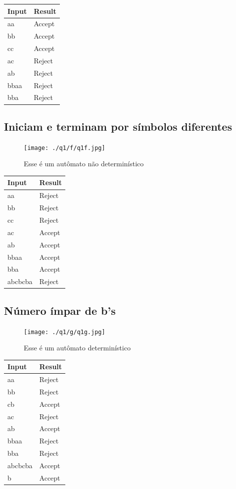 \documentclass[11pt]{article}
\begin{document}
\begin{center}
\begin{tabular}{ll}
Input & Result\\
\hline
aa & Accept\\
bb & Accept\\
cc & Accept\\
ac & Reject\\
ab & Reject\\
bbaa & Reject\\
bba & Reject\\
\end{tabular}
\end{center}
\pagebreak
\subsection{Iniciam e terminam por símbolos diferentes}
\label{sec:org504c22a}

\begin{figure}[htbp]
\centering
\texttt{[image: ./q1/f/q1f.jpg]}
\caption{\label{fig:org5a5969d}
Esse é um autômato não determinístico}
\end{figure}

\begin{center}
\begin{tabular}{ll}
Input & Result\\
\hline
aa & Reject\\
bb & Reject\\
cc & Reject\\
ac & Accept\\
ab & Accept\\
bbaa & Accept\\
bba & Accept\\
abcbcba & Reject\\
\end{tabular}
\end{center}

\pagebreak
\subsection{Número ímpar de b’s}
\label{sec:org6b9afd1}
\begin{figure}[htbp]
\centering
\texttt{[image: ./q1/g/q1g.jpg]}
\caption{\label{fig:org82db3df}
Esse é um autômato determinístico}
\end{figure}

\begin{center}
\begin{tabular}{ll}
Input & Result\\
\hline
aa & Reject\\
bb & Reject\\
cb & Accept\\
ac & Reject\\
ab & Accept\\
bbaa & Reject\\
bba & Reject\\
abcbcba & Accept\\
b & Accept\\
\end{tabular}
\end{center}
\pagebreak
\end{document}
